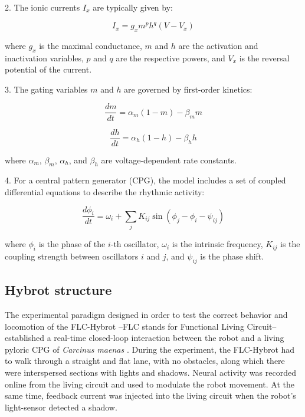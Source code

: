 2. The ionic currents \( I_x \) are typically given by:

\begin{equation}
	I_x = g_x m^p h^q (V - V_x)
\end{equation}

where \( g_x \) is the maximal conductance, \( m \) and \( h \) are the activation and inactivation variables, \( p \) and \( q \) are the respective powers, and \( V_x \) is the reversal potential of the current.

3. The gating variables \( m \) and \( h \) are governed by first-order kinetics:

\begin{equation}
	\frac{dm}{dt} = \alpha_m (1 - m) - \beta_m m
\end{equation}

\begin{equation}
	\frac{dh}{dt} = \alpha_h (1 - h) - \beta_h h
\end{equation}

where \( \alpha_m \), \( \beta_m \), \( \alpha_h \), and \( \beta_h \) are voltage-dependent rate constants.

4. For a central pattern generator (CPG), the model includes a set of coupled differential equations to describe the rhythmic activity:

\begin{equation}
	\frac{d\phi_i}{dt} = \omega_i + \sum_j K_{ij} \sin(\phi_j - \phi_i - \psi_{ij})
\end{equation}

where \( \phi_i \) is the phase of the \( i \)-th oscillator, \( \omega_i \) is the intrinsic frequency, \( K_{ij} \) is the coupling strength between oscillators \( i \) and \( j \), and \( \psi_{ij} \) is the phase shift.



\subsection{Hybrot structure}
The experimental paradigm designed in order to test the correct behavior and locomotion of the FLC-Hybrot --FLC stands for Functional Living Circuit-- established a real-time closed-loop interaction between the robot and a living pyloric CPG of \textit{Carcinus maenas} \cite{elices_robust_2019}. During the experiment, the FLC-Hybrot had to walk through a straight and flat lane, with no obstacles, along which there were interspersed sections with lights and shadows. Neural activity was recorded online from the living circuit and used to modulate the robot movement. At the same time, feedback current was injected into the living circuit when the robot's light-sensor detected a shadow.


